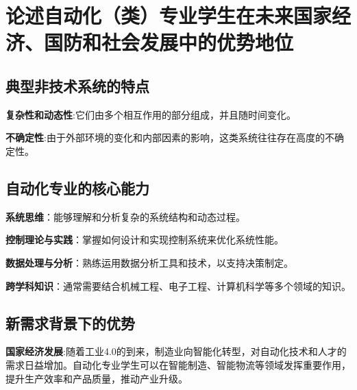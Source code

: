 \documentclass[UTF8,a4paper]{ctexart}
\begin{document}
	
	
	

	\section{论述自动化（类）专业学生在未来国家经济、国防和社会发展中的优势地位}
	\subsection{典型非技术系统的特点}
	\textbf{复杂性和动态性}:它们由多个相互作用的部分组成，并且随时间变化。


	\textbf{不确定性}:由于外部环境的变化和内部因素的影响，这类系统往往存在高度的不确定性。

	\subsection{自动化专业的核心能力}
	\textbf{系统思维}：能够理解和分析复杂的系统结构和动态过程。

	\textbf{控制理论与实践}：掌握如何设计和实现控制系统来优化系统性能。

	\textbf{数据处理与分析}：熟练运用数据分析工具和技术，以支持决策制定。

	\textbf{跨学科知识}：通常需要结合机械工程、电子工程、计算机科学等多个领域的知识。

	\subsection{新需求背景下的优势}
	\textbf{国家经济发展}:随着工业4.0的到来，制造业向智能化转型，对自动化技术和人才的需求日益增加。自动化专业学生可以在智能制造、智能物流等领域发挥重要作用，提升生产效率和产品质量，推动产业升级。
\end{document}
